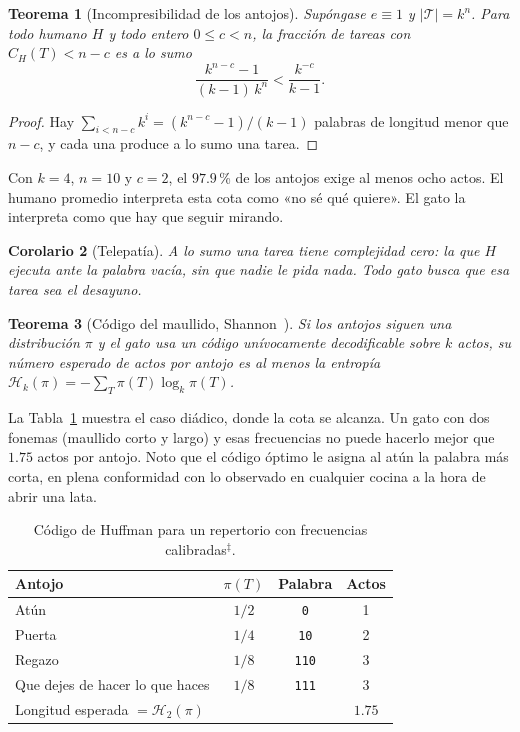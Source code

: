 \documentclass[11pt,a4paper]{article}
\theoremstyle{plain}
\newtheorem{teorema}{Teorema}[section]
\newtheorem{corolario}[teorema]{Corolario}
\theoremstyle{definition}
\theoremstyle{remark}
\numberwithin{equation}{section}
\newcommand{\cg}{C}
\newcommand{\calib}{{\ensuremath{^{\ddagger}}}}
\begin{document}
\begin{teorema}[Incompresibilidad de los antojos]\label{teo:incompresible}
Supóngase $e\equiv 1$ y $|\mathcal T|=k^n$. Para todo humano $H$ y todo entero $0\le c<n$, la fracción de tareas con $\cg_H(T)<n-c$ es a lo sumo
\begin{equation}
  \frac{k^{n-c}-1}{(k-1)\,k^{n}}<\frac{k^{-c}}{k-1}.
\end{equation}
\end{teorema}

\begin{proof}
Hay $\sum_{i<n-c}k^i=(k^{n-c}-1)/(k-1)$ palabras de longitud menor que $n-c$, y cada una produce a lo sumo una tarea.
\end{proof}

Con $k=4$, $n=10$ y $c=2$, el $97.9$\,\% de los antojos exige al menos ocho actos. El humano promedio interpreta esta cota como «no sé qué quiere». El gato la interpreta como que hay que seguir mirando.

\begin{corolario}[Telepatía]
A lo sumo una tarea tiene complejidad cero: la que $H$ ejecuta ante la palabra vacía, sin que nadie le pida nada. Todo gato busca que esa tarea sea el desayuno.
\end{corolario}

\begin{teorema}[Código del maullido, Shannon~\cite{shannon}]\label{teo:codigo}
Si los antojos siguen una distribución $\pi$ y el gato usa un código unívocamente decodificable sobre $k$ actos, su número esperado de actos por antojo es al menos la entropía $\mathcal H_k(\pi)=-\sum_T\pi(T)\log_k\pi(T)$.
\end{teorema}

La Tabla~\ref{tab:codigo} muestra el caso diádico, donde la cota se alcanza. Un gato con dos fonemas (maullido corto y largo) y esas frecuencias no puede hacerlo mejor que $1.75$ actos por antojo. Noto que el código óptimo le asigna al atún la palabra más corta, en plena conformidad con lo observado en cualquier cocina a la hora de abrir una lata.

\begin{table}[ht]
\centering
\caption{Código de Huffman para un repertorio con frecuencias calibradas\calib.}\label{tab:codigo}
\begin{tabular}{lccc}
\toprule
Antojo & $\pi(T)$ & Palabra & Actos \\
\midrule
Atún & $1/2$ & \texttt{0} & 1 \\
Puerta & $1/4$ & \texttt{10} & 2 \\
Regazo & $1/8$ & \texttt{110} & 3 \\
Que dejes de hacer lo que haces & $1/8$ & \texttt{111} & 3 \\
\midrule
\multicolumn{2}{l}{Longitud esperada $=\mathcal H_2(\pi)$} & & $1.75$ \\
\bottomrule
\end{tabular}
\end{table}
\end{document}

